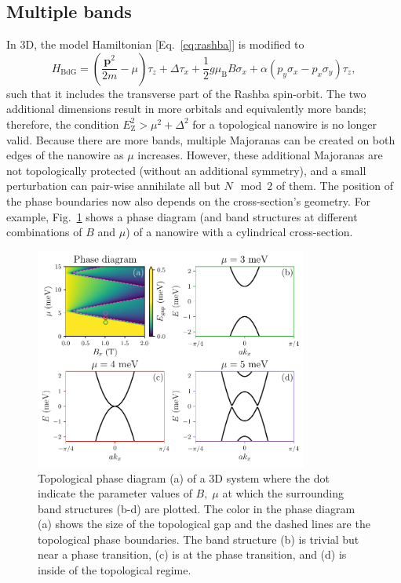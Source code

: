 \subsection{Multiple bands}
In 3D, the model Hamiltonian [Eq.~\eqref{eq:rashba}] is modified to
\begin{equation}
H_{\textrm{BdG}}=\left(\frac{\bm{p}^{2}}{2m}-\mu\right)\tau_{z}+\Delta\tau_{x}+\frac{1}{2}g\mu_{\textrm{B}}B\sigma_{x}+\alpha\left(p_{y}\sigma_{x}-p_{x}\sigma_{y}\right)\tau_{z},\label{eq:3D_Ham}
\end{equation}
such that it includes the transverse part of the Rashba spin-orbit.
The two additional dimensions result in more orbitals and equivalently more bands; therefore, the condition $E_\textrm{Z}^{2}>\mu^{2}+\Delta^{2}$ for a topological nanowire is no longer valid.
Because there are more bands, multiple Majoranas can be created on both edges of the nanowire as $\mu$ increases.
However, these additional Majoranas are not topologically protected (without an additional symmetry), and a small perturbation can pair-wise annihilate all but $N \mod 2$ of them.
The position of the phase boundaries now also depends on the cross-section's geometry.
For example, Fig.~\ref{fig:topo_bands} shows a phase diagram (and band structures at different combinations of $B$ and $\mu$) of a nanowire with a cylindrical cross-section.
\begin{figure}
\begin{center}
\includegraphics[width=0.8\textwidth]{chapter_introduction/figures/phase_diagram_with_bands.pdf}
\caption{Topological phase diagram (a) of a 3D system where the dot indicate the parameter values of $B,\; \mu$ at which the surrounding band structures (b-d) are plotted.
The color in the phase diagram (a) shows the size of the topological gap and the dashed lines are the topological phase boundaries.
The band structure (b) is trivial but near a phase transition, (c) is at the phase transition, and (d) is inside of the topological regime.
\label{fig:topo_bands}}
\end{center}
\end{figure}

